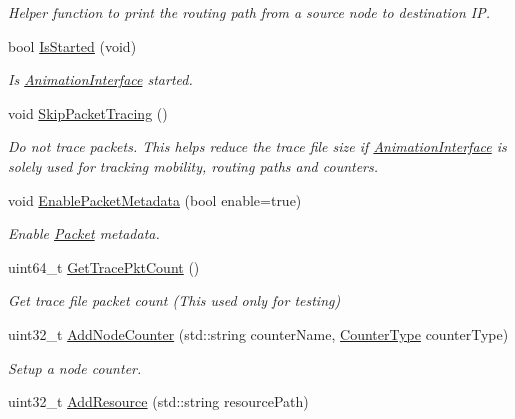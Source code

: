 \begin{DoxyCompactItemize}
\begin{DoxyCompactList}\small\item\em Helper function to print the routing path from a source node to destination IP. \end{DoxyCompactList}\item 
bool \hyperlink{classns3_1_1AnimationInterface_a2cb76669224d804e43c4ad75273a9b59}{Is\+Started} (void)
\begin{DoxyCompactList}\small\item\em Is \hyperlink{classns3_1_1AnimationInterface}{Animation\+Interface} started. \end{DoxyCompactList}\item 
void \hyperlink{classns3_1_1AnimationInterface_a8410c01bcb8379249b97e8474f24cb35}{Skip\+Packet\+Tracing} ()
\begin{DoxyCompactList}\small\item\em Do not trace packets. This helps reduce the trace file size if \hyperlink{classns3_1_1AnimationInterface}{Animation\+Interface} is solely used for tracking mobility, routing paths and counters. \end{DoxyCompactList}\item 
void \hyperlink{classns3_1_1AnimationInterface_a9fd79d5671bb08d25aa43e8d1f8cd2b7}{Enable\+Packet\+Metadata} (bool enable=true)
\begin{DoxyCompactList}\small\item\em Enable \hyperlink{classns3_1_1Packet}{Packet} metadata. \end{DoxyCompactList}\item 
uint64\+\_\+t \hyperlink{classns3_1_1AnimationInterface_aac740ff3156ef010306b90df4c5b8054}{Get\+Trace\+Pkt\+Count} ()
\begin{DoxyCompactList}\small\item\em Get trace file packet count (This used only for testing) \end{DoxyCompactList}\item 
uint32\+\_\+t \hyperlink{classns3_1_1AnimationInterface_a09a8ba111fec10ad13f1d6ea6b5f71a1}{Add\+Node\+Counter} (std\+::string counter\+Name, \hyperlink{classns3_1_1AnimationInterface_a81ef0777d382c5eef63ea798d0ca74b9}{Counter\+Type} counter\+Type)
\begin{DoxyCompactList}\small\item\em Setup a node counter. \end{DoxyCompactList}\item 
uint32\+\_\+t \hyperlink{classns3_1_1AnimationInterface_a86f0418d9272700c196c7843a196558b}{Add\+Resource} (std\+::string resource\+Path)

\end{DoxyCompactItemize}
